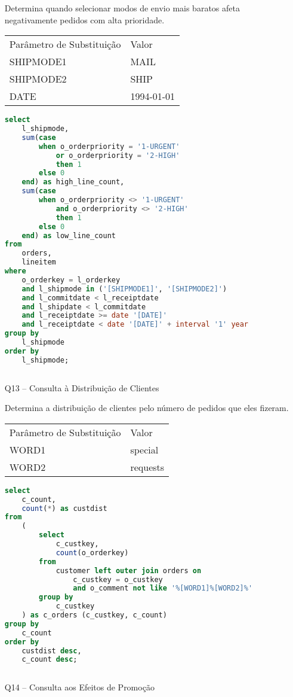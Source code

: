 \begin{enumerate}
    Determina quando selecionar modos de envio mais baratos afeta negativamente pedidos com alta prioridade.
    
\begin{tabular}{ll}
	Parâmetro de Substituição & Valor\\
	SHIPMODE1 & MAIL\\
	SHIPMODE2 & SHIP\\
	DATE & 1994-01-01 \\
\end{tabular}

	\begin{lstlisting}[language=SQL]
select
	l_shipmode,
	sum(case
		when o_orderpriority = '1-URGENT'
			or o_orderpriority = '2-HIGH'
			then 1
		else 0
	end) as high_line_count,
	sum(case
		when o_orderpriority <> '1-URGENT'
			and o_orderpriority <> '2-HIGH'
			then 1
		else 0
	end) as low_line_count
from
	orders,
	lineitem
where
	o_orderkey = l_orderkey
	and l_shipmode in ('[SHIPMODE1]', '[SHIPMODE2]')
	and l_commitdate < l_receiptdate
	and l_shipdate < l_commitdate
	and l_receiptdate >= date '[DATE]'
	and l_receiptdate < date '[DATE]' + interval '1' year
group by
	l_shipmode
order by
	l_shipmode;
	
	\end{lstlisting}
	
\item[Q13 --] Consulta à Distribuição de Clientes

Determina a distribuição de clientes pelo número de pedidos que eles fizeram.

\begin{tabular}{ll}
	Parâmetro de Substituição & Valor\\
	WORD1 & special\\
	WORD2 & requests\\
\end{tabular}

	\begin{lstlisting}[language=SQL]
select
	c_count,
	count(*) as custdist
from
	(
		select
			c_custkey,
			count(o_orderkey)
		from
			customer left outer join orders on
				c_custkey = o_custkey
				and o_comment not like '%[WORD1]%[WORD2]%'
		group by
			c_custkey
	) as c_orders (c_custkey, c_count)
group by
	c_count
order by
	custdist desc,
	c_count desc;
	
	\end{lstlisting}

\item[Q14 --] Consulta aos Efeitos de Promoção


\end{enumerate}
